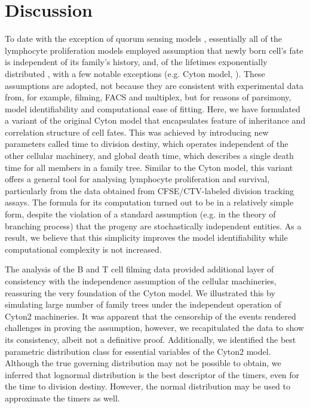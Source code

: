 \documentclass[11pt, a4paper]{article}
\begin{document}
\nolinenumbers
\section{Discussion}
To date with the exception of quorum sensing models \parencite{Kannan.2018, Weber.2013}, essentially all of the lymphocyte proliferation models employed assumption that newly born cell's fate is independent of its family's history, and, of the lifetimes exponentially distributed \parencite{Mazzocco.2017, Banks.2012, Hasenauer.2012, Lee.2009, Yates.2007, Ganusov.2005, Revy.2001, Nordon.1999, Smith.1973}, with a few notable exceptions (e.g. Cyton model, \cite{Yates.2017, Shokhirev.2015, Hyrien.2010, Zilman.2010, Wellard.2010}). These assumptions are adopted, not because they are consistent with experimental data from, for example, filming, FACS and multiplex, but for reasons of parsimony, model identifiability and computational ease of fitting. %
Here, we have formulated a variant of the original Cyton model that encapsulates feature of inheritance and correlation structure of cell fates. This was achieved by introducing new parameters called time to division destiny, which operates independent of the other cellular machinery, and global death time, which describes a single death time for all members in a family tree. Similar to the Cyton model, this variant offers a general tool for analysing lymphocyte proliferation and survival, particularly from the data obtained from CFSE/CTV-labeled division tracking assays. The formula for its computation turned out to be in a relatively simple form, despite the violation of a standard assumption (e.g. in the theory of branching process) that the progeny are stochastically independent entities. As a result, we believe that this simplicity improves the model identifiability while computational complexity is not increased. 

The analysis of the B and T cell filming data provided additional layer of consistency with the independence assumption of the cellular machineries, reassuring the very foundation of the Cyton model. We illustrated this by simulating large number of family trees under the independent operation of Cyton2 machineries. It was apparent that the censorship of the events rendered challenges in proving the assumption, however, we recapitulated the data to show its consistency, albeit not a definitive proof. Additionally, we identified the best parametric distribution class for essential variables of the Cyton2 model. Although the true governing distribution may not be possible to obtain, we inferred that lognormal distribution is the best descriptor of the timers, even for the time to division destiny. However, the normal distribution may be used to approximate the timers as well.
\end{document}
